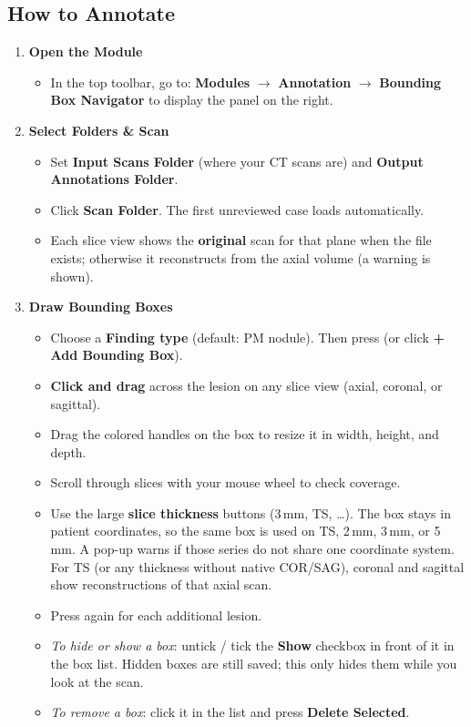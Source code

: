 \documentclass[10pt,a4paper]{article}
\begin{document}
\subsection*{How to Annotate}
\begin{enumerate}[leftmargin=1.5em, itemsep=1.5pt, topsep=1pt]
    \item \textbf{Open the Module}
    \begin{itemize}[leftmargin=1.2em, itemsep=0.5pt]
        \item In the top toolbar, go to: \textbf{Modules} $\rightarrow$ \textbf{Annotation} $\rightarrow$ \textbf{Bounding Box Navigator} to display the panel on the right.
    \end{itemize}

    \item \textbf{Select Folders \& Scan}
    \begin{itemize}[leftmargin=1.2em, itemsep=0.5pt]
        \item Set \textbf{Input Scans Folder} (where your CT scans are) and \textbf{Output Annotations Folder}.
        \item Click \textbf{Scan Folder}. The first unreviewed case loads automatically.
        \item Each slice view shows the \textbf{original} scan for that plane when the file exists; otherwise it reconstructs from the axial volume (a warning is shown).
    \end{itemize}

    \item \textbf{Draw Bounding Boxes}
    \begin{itemize}[leftmargin=1.2em, itemsep=0.5pt]
        \item Choose a \textbf{Finding type} (default: PM nodule). Then press \textbf{} (or click \textbf{+ Add Bounding Box}).
        \item \textbf{Click and drag} across the lesion on any slice view (axial, coronal, or sagittal).
        \item Drag the colored handles on the box to resize it in width, height, and depth.
        \item Scroll through slices with your mouse wheel to check coverage.
        \item Use the large \textbf{slice thickness} buttons (3\,mm, TS, \ldots). The box stays in patient coordinates, so the same box is used on TS, 2\,mm, 3\,mm, or 5\,mm. A pop-up warns if those series do not share one coordinate system. For TS (or any thickness without native COR/SAG), coronal and sagittal show reconstructions of that axial scan.
        \item Press \textbf{} again for each additional lesion.
        \item \textit{To hide or show a box}: untick / tick the \textbf{Show} checkbox in front of it in the box list. Hidden boxes are still saved; this only hides them while you look at the scan.
        \item \textit{To remove a box}: click it in the list and press \textbf{Delete Selected}.
    \end{itemize}


\end{enumerate}
\end{document}
